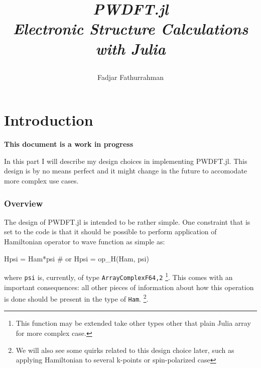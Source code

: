 \documentclass[a4paper,fleqn]{article}
\newcommand{\jlinline}[1]{\texttt{#1}}
\begin{document}
\title{
  \begin{center}{
    \Huge \textit{PWDFT.jl}}\\
    {{\itshape Electronic Structure Calculations with Julia}}
\end{center}
}
\author{Fadjar Fathurrahman}





\maketitle

\newpage
\part{Introduction}



\textbf{This document is a work in progress}

In this part I will describe my design choices in implementing \textsf{PWDFT.jl}.
This design is by no means perfect
and it might change in the future to accomodate more complex use cases.

\section{Overview}

The design of \textsf{PWDFT.jl} is intended to be rather simple. One constraint
that is set to the code is that it should be possible to perform application
of Hamiltonian operator to wave function as simple as:
%
\begin{juliacode}
Hpsi = Ham*psi # or
Hpsi = op_H(Ham, psi)
\end{juliacode}
%
where \jlinline{psi} is, currently, of type \jlinline{Array{ComplexF64,2}}
\footnote{This function may be extended take other types other that plain Julia
array for more complex case.}.
%
This comes with an important consequences: all other pieces of information
about how this operation is done should be present in the type of \jlinline{Ham}.
\footnote{We will also see some quirks related to this design choice later,
such as applying Hamiltonian to several k-points or spin-polarized case}.
\end{document}

